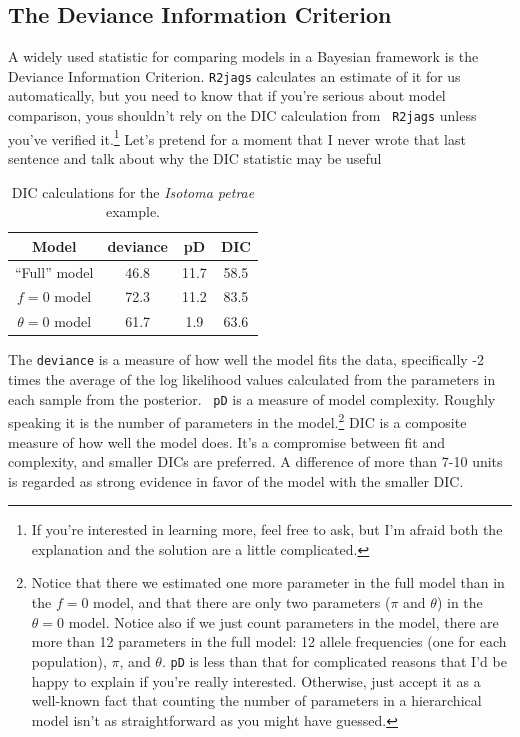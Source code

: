 \documentclass[12pt]{article}
\begin{document}
\subsection*{The Deviance Information Criterion}

A widely used statistic for comparing models in a Bayesian framework
is the Deviance Information Criterion. {\tt R2jags} calculates an estimate of it for us
automatically, but you need to know that if you're serious about model
comparison, yous shouldn't rely on the DIC calculation from {\tt
  R2jags} unless you've verified it.\footnote{If you're interested in
  learning more, feel free to ask, but I'm afraid both the explanation
  and the solution are a little complicated.} Let's pretend for a
moment that I never wrote that last sentence and talk about why the
DIC statistic may be useful

\begin{table}
\begin{center}
\begin{tabular}{c|ccc}
\hline\hline
Model   & deviance & pD    & DIC \\
\hline
``Full'' model & 46.8 & 11.7 & 58.5 \\
$f = 0$ model & 72.3 & 11.2 & 83.5 \\
$\theta = 0$ model & 61.7 & 1.9 & 63.6 \\
\hline
\end{tabular}
\end{center}
\caption{DIC calculations for the {\it Isotoma petrae\/} example.}\label{table:isotoma-petraea-dic}
\end{table}

The {\tt deviance} is a measure of how well the model fits the data,
specifically -2 times the average of the log likelihood values
calculated from the parameters in each sample from the posterior. {\tt
  pD} is a measure of model complexity. Roughly speaking it is the
number of parameters in the model.\footnote{Notice that there we
  estimated one more parameter in the full model than in the $f=0$
  model, and that there are only two parameters ($\pi$ and $\theta$)
  in the $\theta=0$ model. Notice also if we just count parameters in
  the model, there are more than 12 parameters in the full model: 12
  allele frequencies (one for each population), $\pi$, and
  $\theta$. {\tt pD} is less than that for complicated reasons that
  I'd be happy to explain if you're really interested. Otherwise, just
  accept it as a well-known fact that counting the number of
  parameters in a hierarchical model isn't as straightforward as you
  might have guessed.} DIC is a composite measure of how well the
model does. It's a compromise between fit and complexity, and smaller
DICs are preferred. A difference of more than 7-10 units is regarded
as strong evidence in favor of the model with the smaller DIC.
\end{document}

